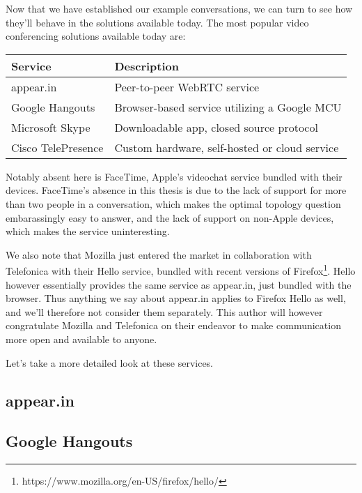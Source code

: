 Now that we have established our example conversations, we can turn to see how they'll behave in the solutions available today. The most popular video conferencing solutions available today are:

\begin{center}
	\label{tab:existing-solutions}
	\begin{tabular}{| l | l |}
		\hline
		\textbf{Service} & \textbf{Description} \\ \hline
		appear.in & Peer-to-peer WebRTC service \\ \hline
		Google Hangouts & Browser-based service utilizing a Google MCU \\ \hline
		Microsoft Skype & Downloadable app, closed source protocol \\ \hline
		Cisco TelePresence & Custom hardware, self-hosted or cloud service \\ \hline
	\end{tabular}
\end{center}

Notably absent here is FaceTime, Apple's videochat service bundled with their devices. FaceTime's absence in this thesis is due to the lack of support for more than two people in a conversation, which makes the optimal topology question embarassingly easy to answer, and the lack of support on non-Apple devices, which makes the service uninteresting.

We also note that Mozilla just entered the market in collaboration with Telefonica with their Hello service, bundled with recent versions of Firefox\footnote{https://www.mozilla.org/en-US/firefox/hello/}. Hello however essentially provides the same service as appear.in, just bundled with the browser. Thus anything we say about appear.in applies to Firefox Hello as well, and we'll therefore not consider them separately. This author will however congratulate Mozilla and Telefonica on their endeavor to make communication more open and available to anyone.

Let's take a more detailed look at these services.

\subsection{appear.in}



\subsection{Google Hangouts}

